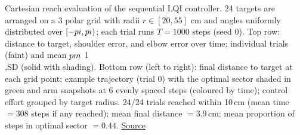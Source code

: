 Cartesian reach evaluation of the sequential LQI controller. 24 targets are arranged on a 3 polar grid with radii $r \in [20, 55]$ cm and angles uniformly distributed over $[-\\pi, \\pi)$; each trial runs $T=1000$ steps (seed 0). Top row: distance to target, shoulder error, and elbow error over time; individual trials (faint) and mean $\\pm$ 1\\,SD (solid with shading). Bottom row (left to right): final distance to target at each grid point; example trajectory (trial 0) with the optimal sector shaded in green and arm snapshots at 6 evenly spaced steps (coloured by time); control effort grouped by target radius. 24/24 trials reached within 10\,cm (mean time $=308$ steps if any reached); mean final distance $=3.9$\,cm; mean proportion of steps in optimal sector $=0.44$. \href{https://github.com/tahmidazam/gg4/blob/main/notebooks/cartesian_control/cartesian_control.ipynb}{\underline{Source}}%